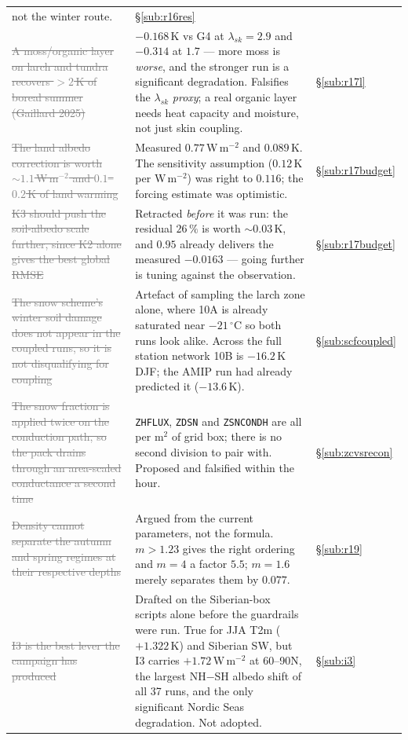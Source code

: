 \documentclass[10pt]{article}
\newcommand{\dead}[1]{\textcolor{gray}{\sout{#1}}}
\begin{document}
\begin{center}
\begin{tabular}{p{} p{} l}
not the winter route. & \S\ref{sub:r16res} \\
\dead{A moss/organic layer on larch and tundra recovers ${>}2$\,K of boreal summer
(Gaillard 2025)} &
$-0.168$\,K vs G4 at $\lambda_{sk}{=}2.9$ and $-0.314$ at $1.7$ --- more moss is \emph{worse},
and the stronger run is a significant degradation. Falsifies the $\lambda_{sk}$ \emph{proxy};
a real organic layer needs heat capacity and moisture, not just skin coupling. &
\S\ref{sub:r17l} \\
\dead{The land albedo correction is worth ${\sim}1.1$\,W\,m$^{-2}$ and $0.1$--$0.2$\,K of land
warming} &
Measured $0.77$\,W\,m$^{-2}$ and $0.089$\,K. The sensitivity assumption ($0.12$\,K per
W\,m$^{-2}$) was right to $0.116$; the forcing estimate was optimistic. & \S\ref{sub:r17budget} \\
\dead{K3 should push the soil-albedo scale further, since K2 alone gives the best global RMSE} &
Retracted \emph{before} it was run: the residual $26\,\%$ is worth ${\sim}0.03$\,K, and $0.95$
already delivers the measured $-0.0163$ --- going further is tuning against the observation. &
\S\ref{sub:r17budget} \\
\dead{The snow scheme's winter soil damage does not appear in the coupled runs, so it is not
disqualifying for coupling} &
Artefact of sampling the larch zone alone, where 10A is already saturated near
$-21\,^\circ$C so both runs look alike. Across the full station network 10B is $-16.2$\,K
DJF; the AMIP run had already predicted it ($-13.6$\,K). & \S\ref{sub:scfcoupled} \\
\dead{The snow fraction is applied twice on the conduction path, so the pack drains through an
area-scaled conductance a second time} &
\texttt{ZHFLUX}, \texttt{ZDSN} and \texttt{ZSNCONDH} are all per m$^2$ of grid box; there is
no second division to pair with. Proposed and falsified within the hour. & \S\ref{sub:zcvsrecon} \\
\dead{Density cannot separate the autumn and spring regimes at their respective depths} &
Argued from the current parameters, not the formula. $m>1.23$ gives the right ordering and
$m=4$ a factor $5.5$; $m=1.6$ merely separates them by $0.077$. & \S\ref{sub:r19} \\
\dead{I3 is the best lever the campaign has produced} &
Drafted on the Siberian-box scripts alone before the guardrails were run. True for JJA T2m
($+1.322$\,K) and Siberian SW, but I3 carries $+1.72$\,W\,m$^{-2}$ at 60--90N, the largest
NH$-$SH albedo shift of all 37 runs, and the only significant Nordic Seas degradation.
Not adopted. & \S\ref{sub:i3} \\
\bottomrule
\end{tabular}
\end{center}
\end{document}
